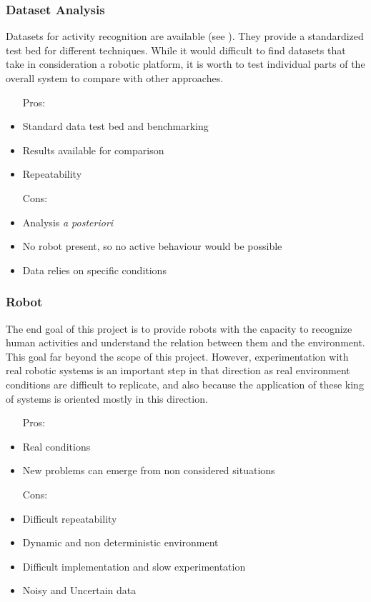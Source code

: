 \subsubsection{Dataset Analysis}
Datasets for activity recognition are available (see \citep{Tenorth2009_TUMKData,Liu2011_BenchmarkDatasHAR}). They provide a standardized test bed for different techniques. While it would difficult to find datasets that take in consideration a robotic platform, it is worth to test individual parts of the overall system to compare with other approaches.
\begin{itemize}
\item[Pros:]
\item Standard data test bed and benchmarking
\item Results available for comparison
\item Repeatability
\end{itemize}
\begin{itemize}
\item[Cons:]
\item Analysis \textit{a posteriori}
\item No robot present, so no active behaviour would be possible
\item Data relies on specific conditions
\end{itemize}

\subsubsection{Robot}
The end goal of this project is to provide robots with the capacity to recognize human activities and understand the relation between them and the environment. This goal far beyond the scope of this project. However, experimentation with real robotic systems is an important step in that direction as real environment conditions are difficult to replicate, and also because the application of these king of systems is oriented mostly in this direction.
\begin{itemize}
\item[Pros:]
\item Real conditions
\item New problems can emerge from non considered situations
\end{itemize}
\begin{itemize}
\item[Cons:]
\item Difficult repeatability
\item Dynamic and non deterministic environment
\item Difficult implementation and slow experimentation
\item Noisy and Uncertain data
\end{itemize}


